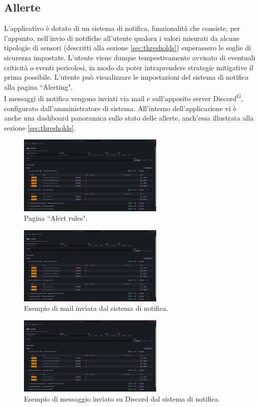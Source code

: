 \documentclass[8pt]{article}
\newcommand{\glossterm}[1]{#1\textsuperscript{G}} %
\begin{document}
\subsection{Allerte} \label{sec:alert}
L'applicativo è dotato di un sistema di notifica, funzionalità che consiste, per l'appunto, nell'invio di notifiche all'utente qualora i valori misurati da alcune tipologie di sensori (descritti alla sezione \ref{sec:thresholds}) superassero le soglie di sicurezza impostate. L'utente viene dunque tempestivamente avvisato di eventuali criticità o eventi pericolosi, in modo da poter intraprendere strategie mitigative il prima possibile. L'utente può visualizzare le impostazioni del sistema di notifica alla pagina ``Alerting". \\ I messaggi di notifica vengono inviati via mail e sull'apposito server \glossterm{Discord}, configurato dall'amministratore di sistema. All'interno dell'applicazione vi è anche una dashboard panoramica sullo stato delle allerte, anch'essa illustrata alla sezione \ref{sec:thresholds}.
\begin{figure}[H]
    \centering
    \includegraphics[width=7cm]{images_mu/alerting.png}
    \caption{Pagina ``Alert rules".}
    \label{fig:Pagina ``Alert rules"}
\end{figure}
\begin{figure}[H]
    \centering
    \includegraphics[width=7cm]{images_mu/alerting.png}
    \caption{Esempio di mail inviata dal sistema di notifica.}
    \label{fig:Esempio di mail inviata dal sistema di notifica}
\end{figure}
\begin{figure}[H]
    \centering
    \includegraphics[width=7cm]{images_mu/alerting.png}
    \caption{Esempio di messaggio inviato su Discord dal sistema di notifica.}
    \label{fig:Esempio di messaggio inviato su Discord dal sistema di notifica}
\end{figure}
\end{document}
